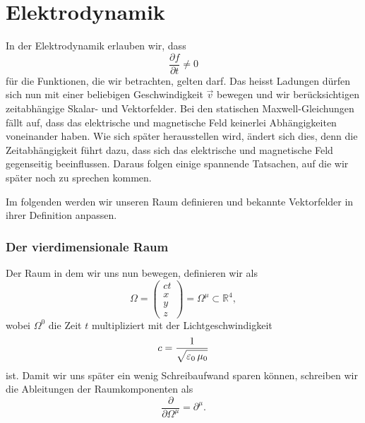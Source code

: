%
%
%
%

\section{Elektrodynamik\label{section:maxwell:elektrodynmaik}}
In der Elektrodynamik erlauben wir, dass
\[
\frac{\partial f}{\partial t}
\neq
0
\]
für die Funktionen, die wir betrachten, gelten darf.
Das heisst Ladungen dürfen sich nun mit einer beliebigen Geschwindigkeit $\vec{v}$ bewegen und wir berücksichtigen zeitabhängige Skalar- und Vektorfelder.
Bei den statischen Maxwell-Gleichungen fällt auf, dass das elektrische und magnetische Feld keinerlei Abhängigkeiten voneinander haben.
Wie sich später herausstellen wird, ändert sich dies, denn die Zeitabhängigkeit führt dazu, dass sich das elektrische und magnetische Feld gegenseitig beeinflussen.
Daraus folgen einige spannende Tatsachen, auf die wir später noch zu sprechen kommen.
 
Im folgenden werden wir unseren Raum definieren und bekannte Vektorfelder in ihrer Definition anpassen.

\subsubsection{Der vierdimensionale Raum}
Der Raum in dem wir uns nun bewegen, definieren wir als
\begin{equation}
	\Omega
	=
	\begin{pmatrix}
		ct\\
		x\\
		y\\
		z
	\end{pmatrix}
	=
	\Omega^{\mu} \subset \mathbb{R}^4,
\end{equation}
wobei $\Omega^0$ die Zeit $t$ multipliziert mit der Lichtgeschwindigkeit
\[
c
=
\frac{1}{\sqrt{\varepsilon_0\,\mu_0\mathstrut}}
\]
ist.
Damit wir uns später ein wenig Schreibaufwand sparen können, schreiben wir die Ableitungen der Raumkomponenten als
\[
\frac{\partial}{\partial \Omega^{\mu}}
=
\partial^{\mu}.
\]

